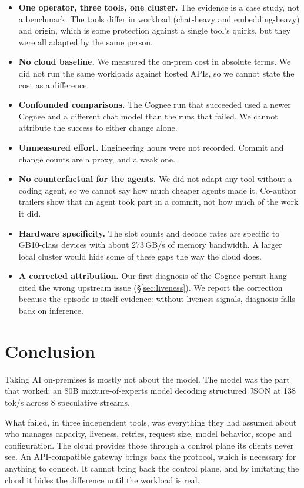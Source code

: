 \documentclass[11pt]{article}
\begin{document}
\begin{itemize}
  \item \textbf{One operator, three tools, one cluster.} The evidence is a case study, not a
    benchmark. The tools differ in workload (chat-heavy and embedding-heavy) and origin, which is
    some protection against a single tool's quirks, but they were all adapted by the same person.
  \item \textbf{No cloud baseline.} We measured the on-prem cost in absolute terms. We did not run
    the same workloads against hosted APIs, so we cannot state the cost as a difference.
  \item \textbf{Confounded comparisons.} The Cognee run that succeeded used a newer Cognee and a
    different chat model than the runs that failed. We cannot attribute the success to either
    change alone.
  \item \textbf{Unmeasured effort.} Engineering hours were not recorded. Commit and change counts are
    a proxy, and a weak one.
  \item \textbf{No counterfactual for the agents.} We did not adapt any tool without a coding agent,
    so we cannot say how much cheaper agents made it. Co-author trailers show that an agent took
    part in a commit, not how much of the work it did.
  \item \textbf{Hardware specificity.} The slot counts and decode rates are specific to GB10-class
    devices with about 273\,GB/s of memory bandwidth. A larger local cluster would hide some of these
    gaps the way the cloud does.
  \item \textbf{A corrected attribution.} Our first diagnosis of the Cognee persist hang cited the
    wrong upstream issue (\S\ref{sec:liveness}). We report the correction because the episode is
    itself evidence: without liveness signals, diagnosis falls back on inference.
\end{itemize}

\section{Conclusion}

Taking AI on-premises is mostly not about the model. The model was the part that worked: an 80B
mixture-of-experts model decoding structured JSON at 138 tok/s across 8 speculative streams.

What failed, in three independent tools, was everything they had assumed about who manages capacity,
liveness, retries, request size, model behavior, scope and configuration. The cloud provides those
through a control plane its clients never see. An API-compatible gateway brings back the protocol,
which is necessary for anything to connect. It cannot bring back the control plane, and by imitating
the cloud it hides the difference until the workload is real.
\end{document}
